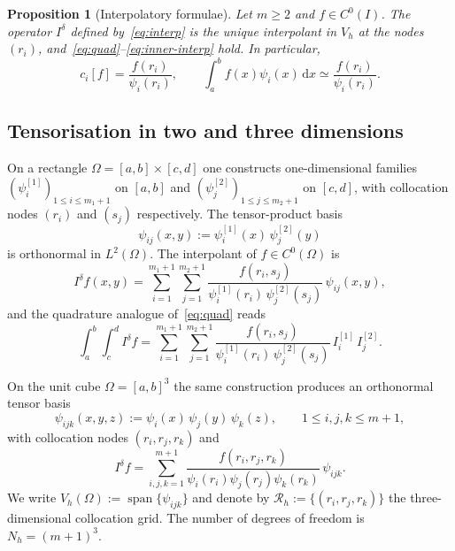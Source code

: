 \documentclass[final,3p,times]{elsarticle}
\theoremstyle{plain}
\newtheorem{proposition}[theorem]{Proposition}
\theoremstyle{definition}
\theoremstyle{remark}
\newcommand{\spanop}{\operatorname{span}}
\newcommand{\dd}{\mathrm{d}}
\begin{document}
\begin{proposition}[Interpolatory formulae]
\label{prop:interp}
Let $m\ge 2$ and $f\in C^0(I)$. The operator $I^\delta$ defined
by~\eqref{eq:interp} is the unique interpolant in $V_h$ at the nodes
$(r_i)$, and~\eqref{eq:quad}--\eqref{eq:inner-interp} hold. In particular,
\begin{equation}
\label{eq:ci}
c_i[f]=\frac{f(r_i)}{\psi_i(r_i)},
\qquad
\int_a^b f(x)\psi_i(x)\,\dd x
\simeq\frac{f(r_i)}{\psi_i(r_i)}.
\end{equation}
\end{proposition}

\subsection{Tensorisation in two and three dimensions}
\label{sec:tensor}

On a rectangle $\Omega=[a,b]\times[c,d]$ one constructs one-dimensional
families $(\psi_i^{[1]})_{1\le i\le m_1+1}$ on $[a,b]$ and
$(\psi_j^{[2]})_{1\le j\le m_2+1}$ on $[c,d]$, with collocation nodes
$(r_i)$ and $(s_j)$ respectively. The tensor-product basis
\begin{equation}
\label{eq:2d-basis}
\psi_{ij}(x,y):=\psi_i^{[1]}(x)\,\psi_j^{[2]}(y)
\end{equation}
is orthonormal in $L^2(\Omega)$. The interpolant of $f\in C^0(\Omega)$ is
\begin{equation}
\label{eq:2d-interp}
I^\delta f(x,y)
=\sum_{i=1}^{m_1+1}\sum_{j=1}^{m_2+1}
\frac{f(r_i,s_j)}{\psi_i^{[1]}(r_i)\,\psi_j^{[2]}(s_j)}
\,\psi_{ij}(x,y),
\end{equation}
and the quadrature analogue of~\eqref{eq:quad} reads
\begin{equation}
\label{eq:2d-quad}
\int_a^b\int_c^d I^\delta f
=\sum_{i=1}^{m_1+1}\sum_{j=1}^{m_2+1}
\frac{f(r_i,s_j)}{\psi_i^{[1]}(r_i)\,\psi_j^{[2]}(s_j)}
\,I_i^{[1]}\,I_j^{[2]}.
\end{equation}

On the unit cube $\Omega=[a,b]^3$ the same construction produces an
orthonormal tensor basis
\begin{equation}
\label{eq:3d-basis}
\psi_{ijk}(x,y,z)
:=\psi_i(x)\,\psi_j(y)\,\psi_k(z),
\qquad
1\le i,j,k\le m+1,
\end{equation}
with collocation nodes $(r_i,r_j,r_k)$ and
\begin{equation}
\label{eq:3d-interp}
I^\delta f
=\sum_{i,j,k=1}^{m+1}
\frac{f(r_i,r_j,r_k)}{\psi_i(r_i)\psi_j(r_j)\psi_k(r_k)}
\,\psi_{ijk}.
\end{equation}
We write $V_h(\Omega):=\spanop\{\psi_{ijk}\}$ and denote by
$\mathcal{R}_h:=\{(r_i,r_j,r_k)\}$ the three-dimensional collocation grid.
The number of degrees of freedom is $N_h=(m+1)^3$.
\end{document}
